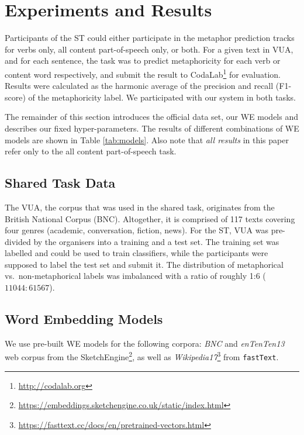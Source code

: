 \documentclass[11pt,a4paper]{article}
\newcommand\fT{\texttt{fastText}\xspace}
\begin{document}
\section{Experiments and Results} %
\label{sec:results}

Participants of the ST could either participate in the metaphor prediction tracks for verbs only, all content part-of-speech only, or both. 
For a given text in VUA, and for each sentence, the task was to predict metaphoricity for each verb or content word respectively, and submit the result to CodaLab\footnote{\url{http://codalab.org}} for evaluation. 
Results were calculated as the harmonic average of the precision and recall (F1-score) of the metaphoricity label.
We participated with our system in both tasks.

The remainder of this section introduces the official data set, our WE models and describes our fixed hyper-parameters.
The results of different combinations of WE models are shown in Table \ref{tab:models}. 
Also note that \emph{all results} in this paper refer only to the all content part-of-speech task.


\subsection{Shared Task Data} %

The VUA, the corpus that was used in the shared task, originates from the British National Corpus (BNC). 
Altogether, it is comprised of 117 texts covering four genres (academic, conversation, fiction, news).
For the ST, VUA was pre-divided by the organisers into a training and a test set.
The training set was labelled and could be used to train classifiers, while the participants were supposed to label the test set and submit it.
The distribution of metaphorical vs.~non-metaphorical labels was imbalanced with a ratio of roughly 1:6 ($11044:61567$).


\subsection{Word Embedding Models}  %
\label{sec:wemodels}

We use pre-built WE models for the following corpora: \emph{BNC} and \emph{enTenTen13} web corpus \cite{1120431} from the SketchEngine\footnote{\url{https://embeddings.sketchengine.co.uk/static/index.html}}, as well as \emph{Wikipedia17}\footnote{\url{https://fasttext.cc/docs/en/pretrained-vectors.html}} from \fT \cite{DBLP:journals/corr/BojanowskiGJM16}. 
\end{document}
